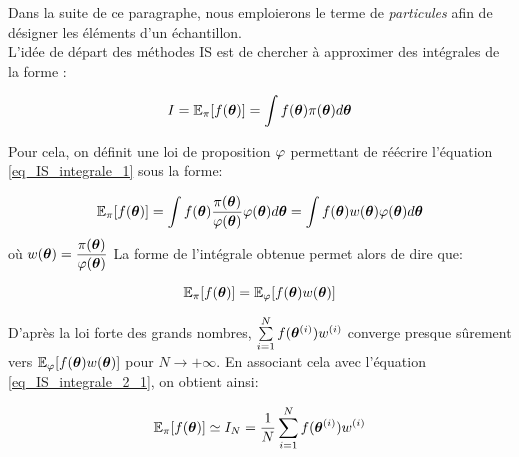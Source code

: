  Dans la suite de ce paragraphe, nous emploierons le terme de \textit{particules} afin de désigner les éléments d'un échantillon.\\
 
 L'idée de départ des méthodes IS est de chercher à approximer des intégrales de la forme : 
 
 \begin{equation}
  I = \mathbb{E}_\pi[f({\bm{\theta}})] = \int f({\bm{\theta}})\pi({\bm{\theta}})d{\bm{\theta}}
  \label{eq_IS_integrale_1}
 \end{equation}
 
 Pour cela, on définit une loi de proposition ${\varphi}$ permettant de réécrire l'équation \eqref{eq_IS_integrale_1} sous la forme:
 
 \begin{equation}
\mathbb{E}_\pi[f({\bm{\theta}})] = \int  f({\bm{\theta}}) \dfrac{\pi({\bm{\theta}})}{{\varphi}({\bm{\theta}})}{\varphi}({\bm{\theta}})d{\bm{\theta}} = \int  f({\bm{\theta}}) w({\bm{\theta}}) {\varphi}({\bm{\theta}})d{\bm{\theta}} 
\label{eq_IS_integrale_2}
 \end{equation}
 où $w({\bm{\theta}}) = \dfrac{\pi({\bm{\theta}})}{{\varphi}({\bm{\theta}})}$  La forme de l'intégrale obtenue permet alors de dire que:
 
\begin{equation}
\mathbb{E}_\pi[f({\bm{\theta}})] = \mathbb{E}_{\varphi}[f({\bm{\theta}})w({\bm{\theta}})] 
\label{eq_IS_integrale_2_1}
\end{equation}

D'après la loi forte des grands nombres,  $\sum\limits_{i=1}^N f({\bm{\theta}}^{(i)}) w^{(i)}$ converge presque sûrement vers  $\mathbb{E}_\varphi[f({\bm{\theta}})w({\bm{\theta}})]$ pour $N \rightarrow + \infty$. En associant cela avec l'équation \eqref{eq_IS_integrale_2_1}, on obtient ainsi:
 
 \begin{equation}
 \mathbb{E}_\pi[f({\bm{\theta}})] \simeq I_N = \dfrac{1}{N}\sum\limits_{i=1}^N f({\bm{\theta}}^{(i)})  w^{(i)}
 \label{eq_IS_integrale_3}
 \end{equation}
 
